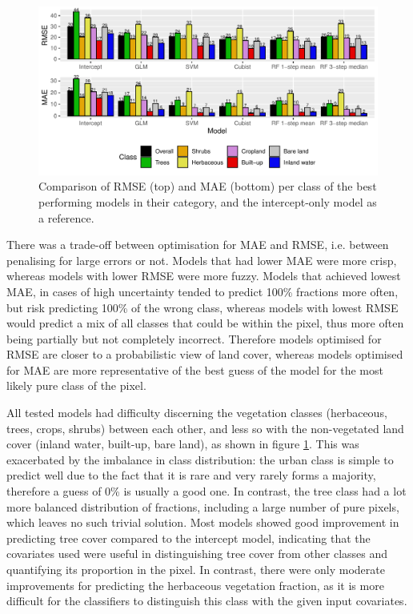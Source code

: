 \documentclass[review,authoryear,3p]{elsarticle}
\begin{document}
\begin{figure}
    \includegraphics[width=\textwidth]{article-figures/barplots/2020-06-03-model-comparison-bar}
    \caption{Comparison of \gls{RMSE} (top) and \gls{MAE} (bottom) per class of the best performing models in their category, and the intercept-only model as a reference.}
    \label{fig-models}
\end{figure}

There was a trade-off between optimisation for \gls{MAE} and \gls{RMSE}, i.e. between penalising for large errors or not.
Models that had lower \gls{MAE} were more crisp, whereas models with lower \gls{RMSE} were more fuzzy.
Models that achieved lowest \gls{MAE}, in cases of high uncertainty tended to predict 100\% fractions more often, but risk predicting 100\% of the wrong class, whereas models with lowest \gls{RMSE} would predict a mix of all classes that could be within the pixel, thus more often being partially but not completely incorrect.
Therefore models optimised for \gls{RMSE} are closer to a probabilistic view of land cover, whereas models optimised for \gls{MAE} are more representative of the best guess of the model for the most likely pure class of the pixel.

All tested models had difficulty discerning the vegetation classes (herbaceous, trees, crops, shrubs) between each other, and less so with the non-vegetated land cover (inland water, built-up, bare land), as shown in figure \ref{fig-models}.
This was exacerbated by the imbalance in class distribution: the urban class is simple to predict well due to the fact that it is rare and very rarely forms a majority, therefore a guess of 0\% is usually a good one.
In contrast, the tree class had a lot more balanced distribution of fractions, including a large number of pure pixels, which leaves no such trivial solution.
Most models showed good improvement in predicting tree cover compared to the intercept model, indicating that the covariates used were useful in distinguishing tree cover from other classes and quantifying its proportion in the pixel.
In contrast, there were only moderate improvements for predicting the herbaceous vegetation fraction, as it is more difficult for the classifiers to distinguish this class with the given input covariates.
\end{document}
